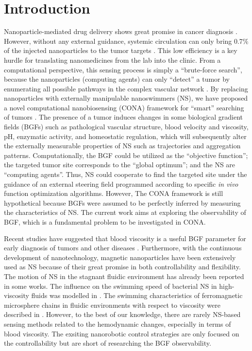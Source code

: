 \documentclass[conference]{IEEEtran}
\begin{document}
\section{Introduction}
Nanoparticle-mediated drug delivery shows great promise in cancer diagnosis \cite{tran2017cancer}. However, without any external guidance, systemic circulation can only bring 0.7{\%} of the injected nanoparticles to the tumor targets \cite{wilhelm2016analysis}. This low efficiency is a key hurdle for translating nanomedicines from the lab into the clinic. From a computational perspective, this sensing process is simply a “brute-force search”, because the nanoparticles (computing agents) can only “detect” a tumor by enumerating all possible pathways in the complex vascular network \cite{shi2019microrobots}. By replacing nanoparticles with externally manipulable nanoswimmers (NS), we have proposed a novel computational nanobiosensing (CONA) framework for “smart” searching of tumors \cite{shi2019perspective}. The presence of a tumor induces changes in some biological gradient fields (BGFs) such as pathological vascular structure, blood velocity and viscosity, pH, enzymatic activity, and homeostatic regulation\cite{shi2019microrobots}, which will subsequently alter the externally measurable properties of NS such as trajectories and aggregation patterns. Computationally, the BGF could be utilized as the “objective function”; the targeted tumor site corresponds to the 
“global optimum”; and the NS are “computing agents”. Thus, NS could cooperate to find the targeted site under the guidance of an external steering field programmed according to specific \emph{in vivo} function optimization algorithms. However, The CONA framework is still hypothetical because BGFs were assumed to be perfectly inferred by measuring the characteristics of NS. The current work aims at exploring the observability of BGF, which is a fundamental problem to be investigated in CONA.

Recent studies have suggested that blood viscosity is a useful BGF parameter for early diagnosis of tumors and other diseases \cite{salve2019design}. Furthermore, with the continuous development of nanotechnology, magnetic nanoparticles have been extensively used as NS because of their great promise in both controllability and flexibility. The motion of NS in the stagnant fluidic environment has already been reported in some works. The influence on the swimming speed of bacterial NS in high-viscosity fluids was modelled in \cite{magariyama2002mathematical}. The swimming characteristics of ferromagnetic microsphere chains in fluidic environments with respect to viscosity were described in \cite{belharet2014study}. However, to the best of our knowledge, there are rarely NS-based sensing methods related to the hemodynamic changes, especially in terms of blood viscosity. The exsiting nanorobotic control strategies are only focused on the controllability but are short of researching the BGF observability.
\end{document}
